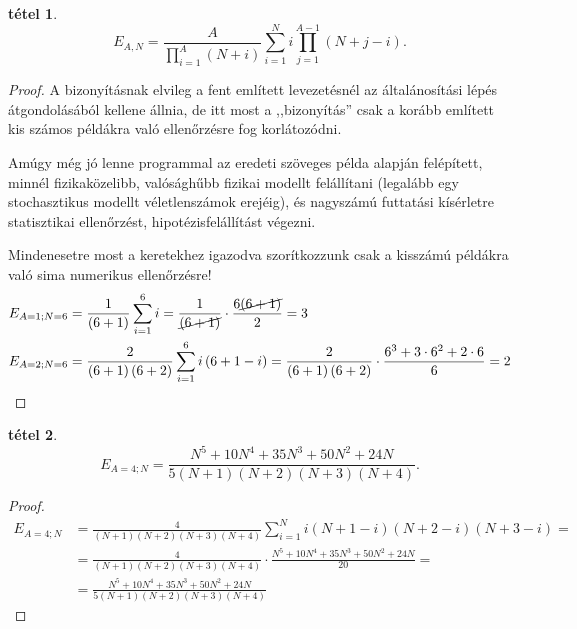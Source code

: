 \documentclass{article}
\newtheorem{theorem}{tétel}
\newcommand{\parenthesed}[1]{\left(#1\right)}
\begin{document}
	\begin{theorem}
		\[
			E_{A,N} = \frac A{\prod_{i=1}^A\parenthesed{N+i}}\sum_{i=1}^N i\prod_{j=1}^{A-1}\parenthesed{N+j-i}.
		\]
	\end{theorem}
	\begin{proof}
		A bizonyításnak elvileg a fent említett levezetésnél az általánosítási lépés átgondolásából kellene állnia,
		de itt most a ,,bizonyítás'' csak a korább említett kis számos példákra való ellenőrzésre fog korlátozódni.

		Amúgy még jó lenne programmal az eredeti szöveges példa alapján felépített, minnél fizikaközelibb, valósághűbb fizikai modellt felállítani
		(legalább egy stochasztikus modellt véletlenszámok erejéig),
		és nagyszámú futtatási kísérletre statisztikai ellenőrzést, hipotézisfelállítást végezni.

		Mindenesetre most a keretekhez igazodva szorítkozzunk csak a kisszámú példákra való sima numerikus ellenőrzésre!
		\begin{align*}
			E_{A=1; N=6 } &= \frac1{\parenthesed{6+1}}\sum_{i=1}^6 i = \frac1{\cancel{\parenthesed{6+1}}}\cdot\frac{6\cancel{\parenthesed{6+1}}}2 = 3\\
			E_{A=2; N=6 } &= \frac2{\parenthesed{6+1}\parenthesed{6+2}}\sum_{i=1}^6 i\parenthesed{6+1-i} = \frac2{\parenthesed{6+1}\parenthesed{6+2}}\cdot\frac{6^3+3\cdot6^2+2\cdot6}{6} = 2
		\end{align*}
	\end{proof}

	\begin{theorem}
		\[
			E_{A=4;N} = \frac{N^5 + 10N^4 + 35N^3 +50N^2 + 24N}{5\parenthesed{N+1}\parenthesed{N+2}\parenthesed{N+3}\parenthesed{N+4}}.
		\]
	\end{theorem}
	\begin{proof}
		\begin{align*}
			E_{A=4; N} &= \frac4{\parenthesed{N+1}\parenthesed{N+2}\parenthesed{N+3}\parenthesed{N+4}}\sum_{i=1}^N i\parenthesed{N+1-i}\parenthesed{N+2-i}\parenthesed{N+3-i} =\\
			           &= \frac4{\parenthesed{N+1}\parenthesed{N+2}\parenthesed{N+3}\parenthesed{N+4}}\cdot\frac{N^5 + 10N^4 + 35N^3 +50N^2 + 24N}{20} =\\
			           &= \frac{N^5 + 10N^4 + 35N^3 +50N^2 + 24N}{5\parenthesed{N+1}\parenthesed{N+2}\parenthesed{N+3}\parenthesed{N+4}}
		\end{align*}
	\end{proof}
\end{document}
